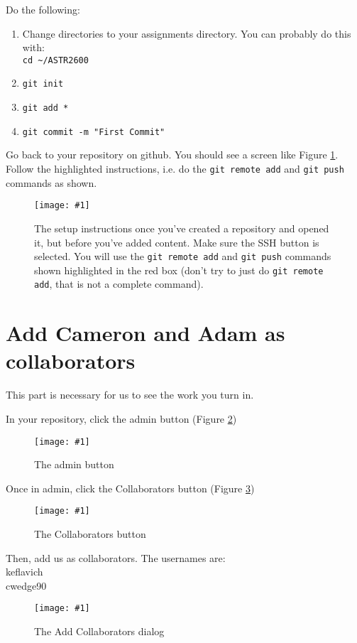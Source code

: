 \documentclass{article}
\def\Figure#1#2#3#4#5{
\begin{figure}[htp]
\texttt{[image: \#1]}
\caption{#2}
\label{#3}
\end{figure}
}
\begin{document}
\begin{spacing}{0.5}
Do the following:
\begin{enumerate}
    \item Change directories to your assignments directory.
        You can probably do this with:\\
        \verb|cd ~/ASTR2600|
    \item \verb|git init|
    \item \verb|git add *|
    \item \verb|git commit -m "First Commit"|
\end{enumerate}

Go back to your repository on github.
You should see a screen like Figure \ref{fig:setup}.  Follow the highlighted
instructions, i.e. do the \texttt{git remote add} and \texttt{git push}
commands as shown.

\Figure{GitSetup.png}
{The setup instructions once you've created a repository and opened it, but
before you've added content.  Make sure the SSH button is selected.  You will
use the \texttt{git remote add} and \texttt{git push} commands shown highlighted
in the red box (don't try to just do \texttt{git remote add}, that is not a
complete command).}
{fig:setup}{0.5}{0}


\clearpage
\section{Add Cameron and Adam as collaborators}
\label{sec:collab}
This part is necessary for us to see the work you turn in.

In your repository, click the admin button (Figure \ref{fig:adminbutton})

\Figure{AdminButton.png}
{The admin button}
{fig:adminbutton}{0.5}{0}

Once in admin, click the Collaborators button (Figure \ref{fig:collabbutton})

\Figure{CollaboratorsButton.png}
{The Collaborators button}
{fig:collabbutton}{0.5}{0}

Then, add us as collaborators.  The usernames are:\\
keflavich\\
cwedge90\\

\Figure{AddCollaborators.png}
{The Add Collaborators dialog}
{fig:addcollab}{0.5}{0}

\end{spacing}
\end{document}
